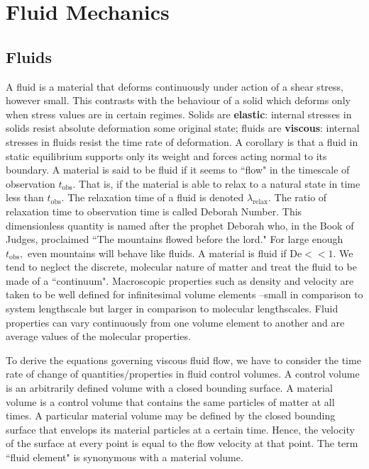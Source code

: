 \chapter{Fluid Mechanics}

\section{Fluids}
A fluid is a material that deforms continuously under action of a shear stress, however small. This contrasts with the behaviour of a solid which deforms only when stress values are in certain regimes. Solids are \textbf{elastic}: internal stresses in solids resist absolute deformation \vvis some original state; fluids are \textbf{viscous}: internal stresses in fluids resist the time rate of deformation. A corollary is that a fluid in static equilibrium supports only its weight and forces acting normal to its boundary. A material is said to be fluid if it seems to ``flow" in the timescale of observation $t_\mathrm{obs}$. That is, if the material is able to relax to a natural state in time less than $t_\mathrm{obs}.$ The relaxation time of a fluid is denoted $\lambda_\text{relax}$. The ratio of relaxation time to observation time is called Deborah Number. This dimensionless quantity is named after the prophet Deborah who, in the Book of Judges, proclaimed ``The mountains flowed before the lord." For large enough $t_\text{obs},$ even mountains will behave like fluids. A material is fluid if $\text{De}<<1.$
We tend to neglect the discrete, molecular nature of matter and treat the fluid to be made of a ``continuum". Macroscopic properties such as density and velocity are taken to be well defined for infinitesimal volume elements --small in comparison to system lengthscale but larger in comparison to molecular lengthscales. Fluid properties can vary continuously from one volume element to another and are average values of the molecular properties.

To derive the equations governing viscous fluid flow, we have to consider the time rate of change of quantities/properties in fluid control volumes. A control volume is an arbitrarily defined volume with a closed bounding surface. A material volume is a control volume that contains the same particles of matter at all times. A particular material volume may be defined by the closed bounding surface that envelops its material particles at a certain time. Hence, the velocity of the surface at every point is equal to the flow velocity at that point. The term ``fluid element" is synonymous with a material volume.

